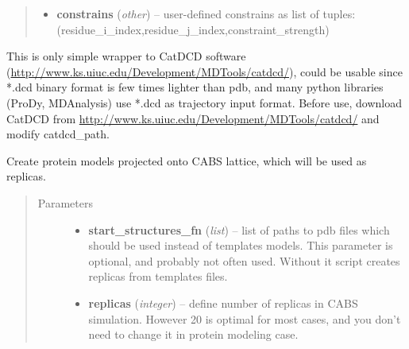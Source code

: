 \documentclass[letterpaper,10pt,english]{sphinxmanual}
\begin{document}
\begin{fulllineitems}
\begin{fulllineitems}
\begin{quote}
\begin{description}
\begin{itemize}
\item {} 
\textbf{constrains} (\emph{other}) -- user-defined constrains as list of tuples: (residue\_i\_index,residue\_j\_index,constraint\_strength)

\end{itemize}

\end{description}\end{quote}

\end{fulllineitems}


\begin{fulllineitems}
\label{index:pycabs.CABS.convertPdbToDcd}
This is only simple wrapper to CatDCD software (\href{http://www.ks.uiuc.edu/Development/MDTools/catdcd/}{http://www.ks.uiuc.edu/Development/MDTools/catdcd/}), 
could be usable since *.dcd binary format is few times lighter than pdb, and many python libraries 
(ProDy, MDAnalysis) use *.dcd as trajectory input format.
Before use, download CatDCD from \href{http://www.ks.uiuc.edu/Development/MDTools/catdcd/}{http://www.ks.uiuc.edu/Development/MDTools/catdcd/} and modify catdcd\_path.

\end{fulllineitems}


\begin{fulllineitems}
\label{index:pycabs.CABS.createLatticeReplicas}
Create protein models projected onto CABS lattice, which will be used as replicas.
\begin{quote}\begin{description}
\item[{Parameters}] \leavevmode\begin{itemize}
\item {} 
\textbf{start\_structures\_fn} (\emph{list}) -- list of paths to pdb files which should be used instead of templates models.  This parameter is optional, and probably not often used. Without it script creates replicas from templates files.

\item {} 
\textbf{replicas} (\emph{integer}) -- define number of replicas in CABS simulation. However 20 is optimal for most cases, and you don't need to change it in protein modeling case.


\end{itemize}
\end{description}
\end{quote}
\end{fulllineitems}
\end{fulllineitems}
\end{document}

